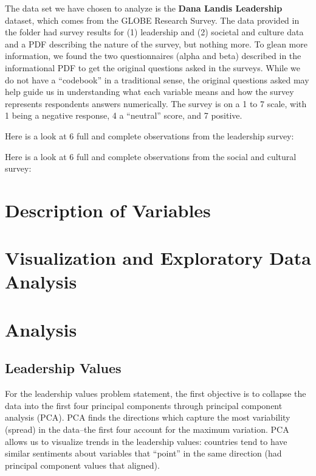 \documentclass[
]{article}
\begin{document}
The data set we have chosen to analyze is the \textbf{Dana Landis
Leadership} dataset, which comes from the GLOBE Research Survey. The
data provided in the folder had survey results for (1) leadership and
(2) societal and culture data and a PDF describing the nature of the
survey, but nothing more. To glean more information, we found the two
questionnaires (alpha and beta) described in the informational PDF to
get the original questions asked in the surveys. While we do not have a
``codebook'' in a traditional sense, the original questions asked may
help guide us in understanding what each variable means and how the
survey represents respondents answers numerically. The survey is on a 1
to 7 scale, with 1 being a negative response, 4 a ``neutral'' score, and
7 positive.

Here is a look at 6 full and complete observations from the leadership
survey:

Here is a look at 6 full and complete observations from the social and
cultural survey:

\hypertarget{description-of-variables}{%
\section{Description of Variables}\label{description-of-variables}}

\hypertarget{visualization-and-exploratory-data-analysis}{%
\section{Visualization and Exploratory Data
Analysis}\label{visualization-and-exploratory-data-analysis}}

\hypertarget{analysis}{%
\section{Analysis}\label{analysis}}

\hypertarget{leadership-values}{%
\subsection{Leadership Values}\label{leadership-values}}

For the leadership values problem statement, the first objective is to
collapse the data into the first four principal components through
principal component analysis (PCA). PCA finds the directions which
capture the most variability (spread) in the data--the first four
account for the maximum variation. PCA allows us to visualize trends in
the leadership values: countries tend to have similar sentiments about
variables that ``point'' in the same direction (had principal component
values that aligned).
\end{document}
